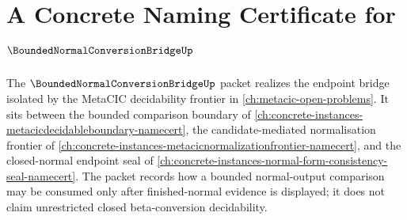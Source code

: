 \chapter{A Concrete Naming Certificate for $\BoundedNormalConversionBridgeUp$}
\label{ch:concrete-instances-bounded-normal-conversion-bridge-namecert}

The $\BoundedNormalConversionBridgeUp$ packet realizes the endpoint bridge isolated by the MetaCIC decidability frontier in \autoref{ch:metacic-open-problems}. It sits between the bounded comparison boundary of \autoref{ch:concrete-instances-metacicdecidableboundary-namecert}, the candidate-mediated normalisation frontier of \autoref{ch:concrete-instances-metacicnormalizationfrontier-namecert}, and the closed-normal endpoint seal of \autoref{ch:concrete-instances-normal-form-consistency-seal-namecert}. The packet records how a bounded normal-output comparison may be consumed only after finished-normal evidence is displayed; it does not claim unrestricted closed beta-conversion decidability.

